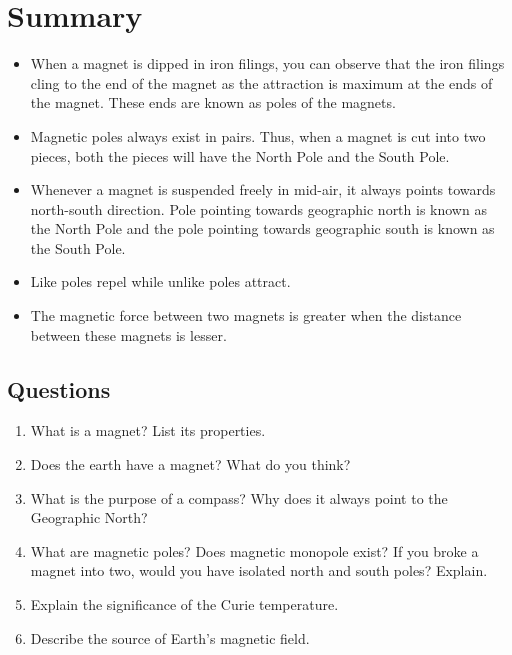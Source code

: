 \documentclass[9pt]{article}
\begin{document}
	\section*{Summary}
	\begin{itemize}
		\item When a magnet is dipped in iron filings, you can observe that the iron filings cling to the end of the magnet as the attraction is maximum at the ends of the magnet. These ends are known as poles of the magnets.
		\item Magnetic poles always exist in pairs. Thus, when a magnet is cut into two pieces, both the pieces will have the North Pole and the South Pole.
		\item Whenever a magnet is suspended freely in mid-air, it always points towards north-south direction. Pole pointing towards geographic north is known as the North Pole and the pole pointing towards geographic south is known as the South Pole.
		\item Like poles repel while unlike poles attract.
		\item The magnetic force between two magnets is greater when the distance between these magnets is lesser.
	\end{itemize}
	\subsection*{Questions}
	\begin{enumerate}
		\item What is a magnet? List its properties.
		\item Does the earth have a magnet? What do you think?
		\item What is the purpose of a compass? Why does it always point to the Geographic North?
		\item What are magnetic poles? Does magnetic monopole exist? If you broke a magnet into two, would you have isolated north
		and south poles? Explain.
		\item Explain the significance of the Curie temperature.
		\item Describe the source of Earth's magnetic field.
	\end{enumerate}
\end{document}

